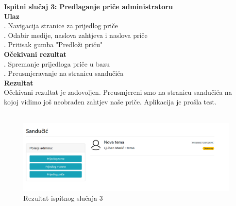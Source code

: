 {			\noindent \textbf{Ispitni slučaj 3: Predlaganje priče administratoru}
			\\
			\textbf{Ulaz}
			\\
			. Navigacija stranice za prijedlog priče \\
			. Odabir medije, naslova zahtjeva i naslova priče \\
			. Pritisak gumba "Predloži priču"
			\\
			\textbf{Očekivani rezultat}
			\\
			. Spremanje prijedloga priče u bazu \\
			. Preusmjeravanje na stranicu sandučića
			\\
			\textbf{Rezultat}
			\\
			\indent Očekivani rezultat je zadovoljen. Preusmjereni smo na stranicu sandučića na kojoj vidimo još neobrađen zahtjev naše priče. Aplikacija je prošla test.
			\\ \\
			\begin{figure}[H]
				\centering
				\includegraphics[scale=0.34]{"slike/test3"}
				\caption{Rezultat ispitnog slučaja 3}
				\label{fig:rezultat-ispitnog-slucaja-3}
			\end{figure}
			
}
